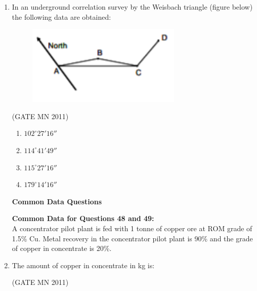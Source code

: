 \documentclass[journal]{IEEEtran}
\begin{document}
\begin{enumerate}
\hfill(GATE MN 2011)

\begin{multicols}{4}
\begin{enumerate}
\item 0.40  
\item 0.51  
\item 0.66  
\item 0.77  
\end{enumerate}
\end{multicols}

\item In an underground correlation survey by the Weisbach triangle (figure below) the following data are obtained:  
\begin{figure}[H]
    \centering
        \includegraphics[width=0.7\textwidth]{Screenshot_2025_0816_112932.png}
	    \caption{}
    \label{fig:Q47}
    \end{figure} 


    \hfill(GATE MN 2011)
\begin{multicols}{2}
\begin{enumerate}
\item $102^\circ 27' 16''$  
\item $114^\circ 41' 49''$  
\item $115^\circ 27' 16''$  
\item $179^\circ 14' 16''$
\end{enumerate}
\end{multicols}

\textbf{Common Data Questions}

\textbf{Common Data for Questions 48 and 49:}\\  
A concentrator pilot plant is fed with 1 tonne of copper ore at ROM grade of 1.5\% Cu. Metal recovery in the concentrator pilot plant is 90\% and the grade of copper in concentrate is 20\%.  

\item The amount of copper in concentrate in kg is:  

	\hfill(GATE MN 2011)


\end{enumerate}
\end{document}
